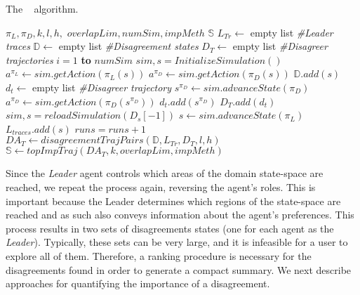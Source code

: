 \begin{algorithm}[tb]
    \caption{The \disalg~ algorithm. }
    \label{alg:disagreements}
\begin{algorithmic}[1]
     $\pi_L,\pi_D, k, l, h,$ \STATE $overlapLim,
    numSim, impMeth$  $\mathbb{S}$ \STATE $L_{Tr}
    \leftarrow$ empty list \textit{\;\;\;\#Leader traces} \STATE $\mathbb{D}
    \leftarrow$ empty list \textit{\;\;\;\#Disagreement states} \STATE $D_T
    \leftarrow$ empty list \textit{\;\;\;\#Disagreer trajectories}  \FOR
    {$i=1$ {\bfseries to} $numSim$} \STATE $sim, s = InitializeSimulation()$
     \STATE $a^{\pi_L} \leftarrow
    sim.getAction(\pi_L(s))$ \STATE $a^{\pi_D} \leftarrow
    sim.getAction(\pi_D(s))$  \STATE
    $\mathbb{D}.add(s)$ \STATE $d_t \leftarrow$ empty list
    \textit{\;\;\;\#Disagreer trajectory} 
    \STATE $s^{\pi_D} \leftarrow sim.advanceState(\pi_D)$ \STATE $a^{\pi_D}
    \leftarrow sim.getAction(\pi_D(s^{\pi_D}))$ \STATE $d_t.add(s^{\pi_D})$ \ENDFOR \STATE
    $D_T.add(d_t)$ \STATE $sim, s = reloadSimulation(D_s[-1])$ \ENDIF \STATE $s
    \leftarrow sim.advanceState(\pi_L)$ \STATE $L_{traces}.add(s)$ \ENDWHILE
    \STATE $runs = runs+1$ \ENDFOR \STATE $DA_T \leftarrow
    disagreementTrajPairs(\mathbb{D},L_{Tr}, D_T, l, h)$ \STATE $\mathbb{S}
    \leftarrow topImpTraj(DA_T, k, overlapLim, impMeth)$
    \end{algorithmic}
\end{algorithm}


Since the \emph{Leader} agent controls which areas of the domain state-space are reached, we repeat the process again, reversing the agent's roles. This is important because the Leader determines which regions of the state-space are reached and as such also conveys information about the agent's preferences. This process results in two sets of disagreements states (one for each agent as the \emph{Leader}). Typically, these sets can be very large, and it is infeasible for a user to explore all of them. 
Therefore, a ranking procedure is
necessary for the disagreements found in order to generate a compact summary. We next describe approaches for
quantifying the importance of a disagreement.


